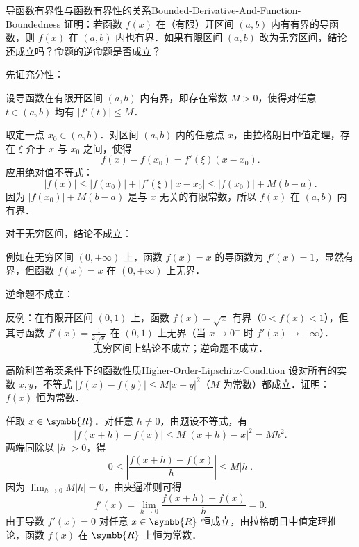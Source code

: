 \begin{problem}{导函数有界性与函数有界性的关系}{Bounded-Derivative-And-Function-Boundedness}
    证明：若函数 $f(x)$ 在（有限）开区间 $(a, b)$ 内有有界的导函数，则 $f(x)$ 在 $(a, b)$ 内也有界．如果有限区间 $(a, b)$ 改为无穷区间，结论还成立吗？命题的逆命题是否成立？
\end{problem}

\begin{solution}
    先证充分性：

    设导函数在有限开区间 $(a, b)$ 内有界，即存在常数 $M > 0$，使得对任意 $t \in (a, b)$ 均有 $|f'(t)| \leqslant M$．

    取定一点 $x_0 \in (a, b)$．对区间 $(a, b)$ 内的任意点 $x$，由拉格朗日中值定理，存在 $\xi$ 介于 $x$ 与 $x_0$ 之间，使得
    \begin{equation}
        f(x) - f(x_0) = f'(\xi)(x - x_0).
    \end{equation}
    应用绝对值不等式：
    \begin{equation}
        |f(x)| \leqslant |f(x_0)| + |f'(\xi)| |x - x_0| \leqslant |f(x_0)| + M(b - a).
    \end{equation}
    因为 $|f(x_0)| + M(b - a)$ 是与 $x$ 无关的有限常数，所以 $f(x)$ 在 $(a, b)$ 内有界．

    对于无穷区间，结论不成立：

    例如在无穷区间 $(0, +\infty)$ 上，函数 $f(x) = x$ 的导函数为 $f'(x) = 1$，显然有界，但函数 $f(x) = x$ 在 $(0, +\infty)$ 上无界．

    逆命题不成立：

    反例：在有限开区间 $(0, 1)$ 上，函数 $f(x) = \sqrt{x}$ 有界（$0 < f(x) < 1$），但其导函数 $f'(x) = \frac{1}{2\sqrt{x}}$ 在 $(0, 1)$ 上无界（当 $x \to 0^+$ 时 $f'(x) \to +\infty$）．
    \begin{equation}
        \boxed{\text{无穷区间上结论不成立；逆命题不成立．}}
    \end{equation}
\end{solution}

\begin{problem}{高阶利普希茨条件下的函数性质}{Higher-Order-Lipschitz-Condition}
    设对所有的实数 $x, y$，不等式 $|f(x) - f(y)| \leqslant M|x - y|^2$（$M$ 为常数）都成立．证明：$f(x)$ 恒为常数．
\end{problem}

\begin{myproof}
    任取 $x \in \symbb{R}$．对任意 $h \neq 0$，由题设不等式，有
    \begin{equation}
        |f(x+h) - f(x)| \leqslant M |(x+h) - x|^2 = M h^2.
    \end{equation}
    两端同除以 $|h| > 0$，得
    \begin{equation}
        0 \leqslant \left| \frac{f(x+h) - f(x)}{h} \right| \leqslant M|h|.
    \end{equation}
    因为 $\lim_{h\to 0} M|h| = 0$，由夹逼准则可得
    \begin{equation}
        f'(x) = \lim_{h\to 0} \frac{f(x+h) - f(x)}{h} = 0.
    \end{equation}
    由于导数 $f'(x) = 0$ 对任意 $x \in \symbb{R}$ 恒成立，由拉格朗日中值定理推论，函数 $f(x)$ 在 $\symbb{R}$ 上恒为常数．
\end{myproof}

